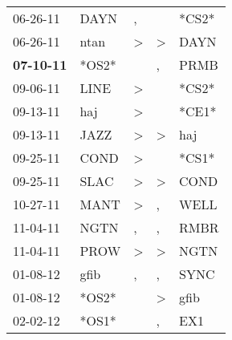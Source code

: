 \begin{supertabular}{p{0.07\textwidth}p{0.06\textwidth}p{0.02\textwidth}p{0.02\textwidth}p{0.06\textwidth}}
          06-26-11\textsuperscript{} &           DAYN\textsuperscript{} &                , &                  &                            *CS2* \\
          06-26-11\textsuperscript{} &           ntan\textsuperscript{} &     \textgreater &     \textgreater &           DAYN\textsuperscript{} \\
 \textbf{07-10-11\textsuperscript{}} &                            *OS2* &                  &                , &           PRMB\textsuperscript{} \\
          09-06-11\textsuperscript{} &           LINE\textsuperscript{} &     \textgreater &                  &                            *CS2* \\
          09-13-11\textsuperscript{} &            haj\textsuperscript{} &     \textgreater &                  &                            *CE1* \\
          09-13-11\textsuperscript{} &           JAZZ\textsuperscript{} &     \textgreater &     \textgreater &            haj\textsuperscript{} \\
          09-25-11\textsuperscript{} &           COND\textsuperscript{} &     \textgreater &                  &                            *CS1* \\
          09-25-11\textsuperscript{} &           SLAC\textsuperscript{} &     \textgreater &     \textgreater &           COND\textsuperscript{} \\
          10-27-11\textsuperscript{} &           MANT\textsuperscript{} &     \textgreater &                , &           WELL\textsuperscript{} \\
          11-04-11\textsuperscript{} &           NGTN\textsuperscript{} &                , &                , &           RMBR\textsuperscript{} \\
          11-04-11\textsuperscript{} &           PROW\textsuperscript{} &     \textgreater &     \textgreater &           NGTN\textsuperscript{} \\
          01-08-12\textsuperscript{} &           gfib\textsuperscript{} &                , &                , &           SYNC\textsuperscript{} \\
          01-08-12\textsuperscript{} &                            *OS2* &                  &     \textgreater &           gfib\textsuperscript{} \\
          02-02-12\textsuperscript{} &                            *OS1* &                  &                , &            EX1\textsuperscript{} \\

\end{supertabular}
